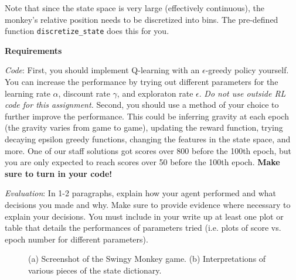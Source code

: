 \documentclass[submit]{harvardml}
\begin{document}
\begin{problem}
Note that since the state space is very large (effectively continuous), the monkey's relative position needs to be discretized into bins. The pre-defined function \verb|discretize_state| does this for you.

\textbf{Requirements}

\textit{Code}: First, you should implement Q-learning with an
$\epsilon$-greedy policy yourself. You can increase the performance by
trying out different parameters for the learning rate $\alpha$,
discount rate $\gamma$, and exploraton rate $\epsilon$. \emph{Do not use outside RL code for this assignment.} Second, you should use a method of your choice to further improve the performance. This could be inferring gravity at each epoch (the gravity varies from game to game), updating the reward function, trying decaying epsilon greedy functions, changing the features in the state space, and more. One of our staff solutions got scores over 800 before the 100th epoch, but you are only expected to reach scores over 50 before the 100th epoch. {\bf Make sure to turn in your code!} 

\textit{Evaluation}: In 1-2 paragraphs, explain how your agent performed and what decisions you made and why. Make sure to provide evidence where necessary to explain your decisions. You must include in your write up at least one plot or table that details the performances of parameters tried (i.e. plots of score vs. epoch number for different parameters).
\end{problem}

\begin{figure}[H]
    \centering
    \hfill
    \caption{(a) Screenshot of the Swingy Monkey game.  (b) Interpretations of various pieces of the state dictionary.}
\end{figure}
\end{document}
